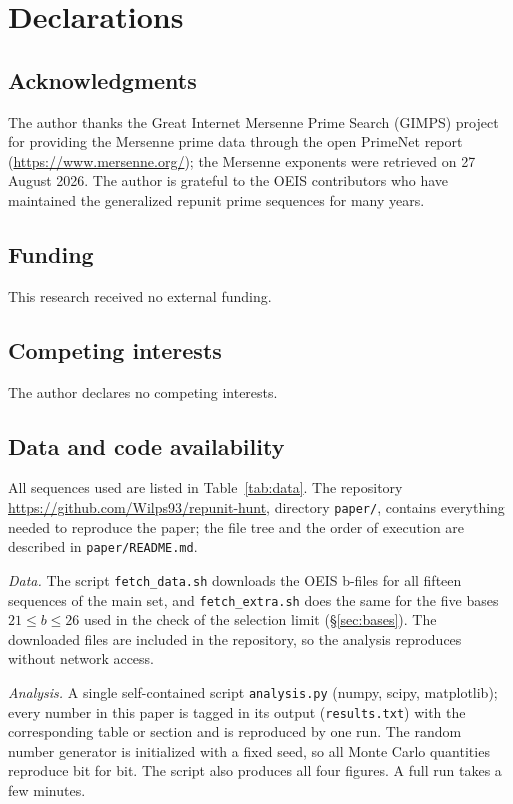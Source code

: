\documentclass[11pt,a4paper]{article}
\theoremstyle{plain}
\theoremstyle{remark}
\begin{document}
\section*{Declarations}

\subsection*{Acknowledgments}
The author thanks the Great Internet Mersenne Prime Search (GIMPS) project for
providing the Mersenne prime data through the open PrimeNet report
(\url{https://www.mersenne.org/}); the Mersenne exponents were retrieved on
27 August 2026. The author is grateful to the OEIS contributors who have
maintained the generalized repunit prime sequences for many years.

\subsection*{Funding}
This research received no external funding.

\subsection*{Competing interests}
The author declares no competing interests.

\subsection*{Data and code availability}
All sequences used are listed in Table~\ref{tab:data}. The repository
\url{https://github.com/Wilps93/repunit-hunt}, directory \texttt{paper/},
contains everything needed to reproduce the paper; the file tree and the order
of execution are described in \texttt{paper/README.md}.

\emph{Data.} The script \texttt{fetch\_data.sh} downloads the OEIS b-files for
all fifteen sequences of the main set, and \texttt{fetch\_extra.sh} does the
same for the five bases $21\le b\le26$ used in the check of the selection limit
(\S\ref{sec:bases}). The downloaded files are included in the repository, so the
analysis reproduces without network access.

\emph{Analysis.} A single self-contained script \texttt{analysis.py} (numpy,
scipy, matplotlib); every number in this paper is tagged in its output
(\texttt{results.txt}) with the corresponding table or section and is reproduced
by one run. The random number generator is initialized with a fixed seed, so all
Monte Carlo quantities reproduce bit for bit. The script also produces all four
figures. A full run takes a few minutes.
\end{document}
